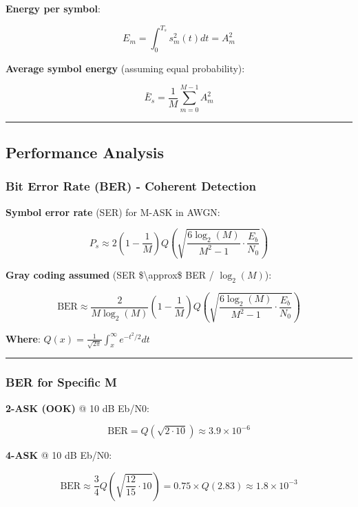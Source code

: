 \textbf{Energy per symbol}:

\[
E_m = \int_0^{T_s} s_m^2(t) dt = A_m^2
\]

\textbf{Average symbol energy} (assuming equal probability):

\[
\bar{E}_s = \frac{1}{M} \sum_{m=0}^{M-1} A_m^2
\]

\begin{center}\rule{0.5\linewidth}{0.5pt}\end{center}

\subsection{Performance Analysis}\label{performance-analysis}

\subsubsection{Bit Error Rate (BER) - Coherent
Detection}\label{bit-error-rate-ber---coherent-detection}

\textbf{Symbol error rate} (SER) for M-ASK in AWGN:

\[
P_s \approx 2\left(1 - \frac{1}{M}\right) Q\left(\sqrt{\frac{6\log_2(M)}{M^2 - 1} \cdot \frac{E_b}{N_0}}\right)
\]

\textbf{Gray coding assumed} (SER \$\textbackslash approx\$ BER /
\(\log_2(M)\)):

\[
\text{BER} \approx \frac{2}{M\log_2(M)}\left(1 - \frac{1}{M}\right) Q\left(\sqrt{\frac{6\log_2(M)}{M^2 - 1} \cdot \frac{E_b}{N_0}}\right)
\]

\textbf{Where}:
\(Q(x) = \frac{1}{\sqrt{2\pi}} \int_x^\infty e^{-t^2/2} dt\)

\begin{center}\rule{0.5\linewidth}{0.5pt}\end{center}

\subsubsection{BER for Specific M}\label{ber-for-specific-m}

\textbf{2-ASK (OOK)} @ 10 dB Eb/N0:

\[
\text{BER} = Q\left(\sqrt{2 \cdot 10}\right) \approx 3.9 \times 10^{-6}
\]

\textbf{4-ASK} @ 10 dB Eb/N0:

\[
\text{BER} \approx \frac{3}{4} Q\left(\sqrt{\frac{12}{15} \cdot 10}\right) = 0.75 \times Q(2.83) \approx 1.8 \times 10^{-3}
\]

